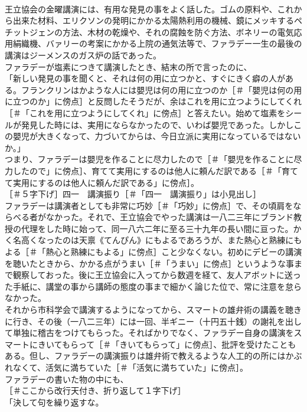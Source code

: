 \documentclass[8pt]{extreport}
\begin{document}
\begin{CJK}{UTF8}{min}
\\	王立協会の金曜講演には、有用な発見の事をよく話した。ゴムの原料や、これから出来た材料、エリクソンの発明にかかる太陽熱利用の機械、鏡にメッキするペチットジェンの方法、木材の乾燥や、それの腐蝕を防ぐ方法、ボネリーの電気応用絹織機、バァリーの考案にかかる上院の通気法等で、ファラデー一生の最後の講演はジーメンスのガス炉の話であった。
\\	ファラデーが塩素につきて講演したとき、結末の所で言ったのに、
\\	「新しい発見の事を聞くと、それは何の用に立つかと、すぐにきく癖の人がある。フランクリンはかような人には嬰児は何の用に立つのか［＃「嬰児は何の用に立つのか」に傍点］と反問したそうだが、余はこれを用に立つようにしてくれ［＃「これを用に立つようにしてくれ」に傍点］と答えたい。始めて塩素をシールが発見した時には、実用にならなかったので、いわば嬰児であった。しかしこの嬰児が大きくなって、力づいてからは、今日立派に実用になっているではないか。」
\\	つまり、ファラデーは嬰児を作ることに尽力したので［＃「嬰児を作ることに尽力したので」に傍点］、育てて実用にするのは他人に頼んだ訳である［＃「育てて実用にするのは他人に頼んだ訳である」に傍点］。
\\	［＃５字下げ］四一　講演振り［＃「四一　講演振り」は小見出し］
\\	ファラデーは講演者としても非常に巧妙［＃「巧妙」に傍点］で、その頃肩をならべる者がなかった。それで、王立協会でやった講演は一八二三年にブランド教授の代理をした時に始って、同一八六二年に至る三十九年の長い間に亘った。かく名高くなったのは天禀《てんぴん》にもよるであろうが、また熱心と熟練にもよる［＃「熱心と熟練にもよる」に傍点］こと少なくない。初めにデビーの講演を聴いたときから、かかる点がうまい［＃「うまい」に傍点］というような事まで観察しておった。後に王立協会に入ってから数週を経て、友人アボットに送った手紙に、講堂の事から講師の態度の事まで細かく論じた位で、常に注意を怠らなかった。
\\	それから市科学会で講演するようになってから、スマートの雄弁術の講義を聴きに行き、その後（一八二三年）には一回、半ギニー（十円五十銭）の謝礼を出して単独に稽古をつけてもらった。そればかりでなく、ファラデー自身の講演をスマートにきいてもらって［＃「きいてもらって」に傍点］、批評を受けたこともある。但し、ファラデーの講演振りは雄弁術で教えるような人工的の所にはかぶれなくて、活気に満ちていた［＃「活気に満ちていた」に傍点］。
\\	ファラデーの書いた物の中にも、
\\	［＃ここから改行天付き、折り返して１字下げ］
\\	「決して句を繰り返すな。

\end{CJK}
\end{document}
